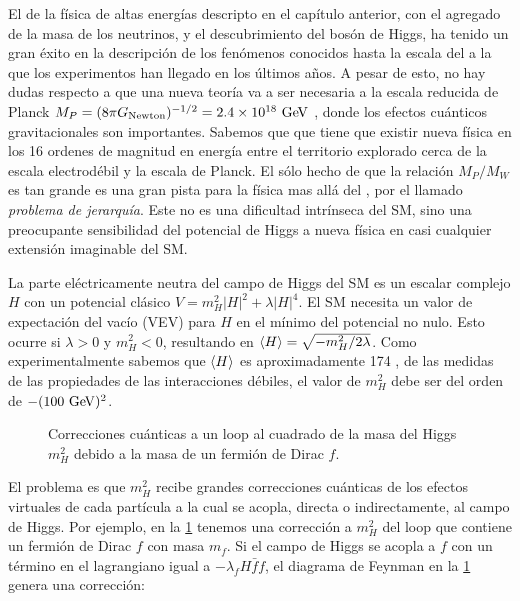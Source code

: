 El {\SM} de la física de altas energías descripto en el capítulo anterior, con
el agregado de la masa de los neutrinos, y el descubrimiento del bosón de Higgs,
ha tenido un gran éxito en la descripción de los fenómenos conocidos hasta la
escala del {\tev} a la que los experimentos han llegado en los últimos a\~nos.
A pesar de esto, no hay dudas respecto a que una nueva teoría va a ser necesaria
a la escala reducida de Planck $M_P = (8\pi G_\text{Newton})^{-1/2} = 2.4 \times
10^{18} \gev$ , donde los efectos cuánticos gravitacionales son importantes.
Sabemos que que tiene que existir nueva física en los 16 ordenes de magnitud en
energía entre el territorio explorado cerca de la escala electrodébil y la
escala de Planck. El sólo hecho de que la relación $M_P/M_W$ es tan grande es
una gran pista para la física mas allá del {\SM}, por el llamado \emph{problema
  de jerarquía}. Este no es una dificultad intrínseca del SM, sino una
preocupante sensibilidad del potencial de Higgs a nueva física en casi cualquier
extensión imaginable del SM.

La parte eléctricamente neutra del campo de Higgs del SM es un escalar complejo
$H$ con un potencial clásico $V=m_H^2 |H|^2 + \lambda|H|^4$. El SM necesita un
valor de expectación del vacío (VEV) para $H$ en el mínimo del potencial no
nulo. Esto ocurre si $\lambda>0$ y $m_H^2<0$, resultando en $\langle H \rangle =
\sqrt{-m_H^2/2\lambda}$. Como experimentalmente sabemos que $\langle H \rangle$ es
aproximadamente 174 \gev, de las medidas de las propiedades de las interacciones
débiles, el valor de $m_H^2$ debe ser del orden de $-(100 \gev)^2$.

\begin{figure}[!htbp]
  \centering 
  \caption{Correcciones cu\'anticas a un loop al cuadrado de la masa del Higgs
    $m_H^2$ debido a la masa de un fermión de Dirac $f$.}
  \label{fig:higgs_correction_f}
\end{figure}

El problema es que $m_H^2$ recibe grandes correcciones cuánticas de los efectos
virtuales de cada partícula a la cual se acopla, directa o indirectamente, al
campo de Higgs. Por ejemplo, en la \cref{fig:higgs_correction_f} tenemos una
corrección a $m_H^2$ del loop que contiene un fermión de Dirac $f$ con masa
$m_f$. Si el campo de Higgs se acopla a $f$ con un término en el lagrangiano
igual a $-\lambda_f H \bar{f}f$, el diagrama de Feynman en la
\cref{fig:higgs_correction_f} genera una corrección:

